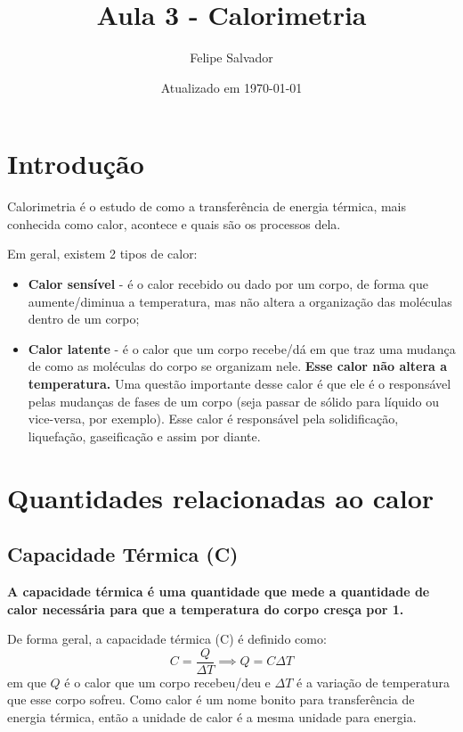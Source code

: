 \documentclass[12pt]{extarticle}
\title{Aula 3 - Calorimetria}
\author{Felipe Salvador}
\date{Atualizado em \today}
\newcommand{\<}{\langle}
\renewcommand{\>}{\rangle}
\theoremstyle{definition}
\begin{document}
\maketitle

\section{Introdução}

Calorimetria é o estudo de como a transferência de energia térmica, mais conhecida como calor, acontece e quais são os processos dela.

Em geral, existem 2 tipos de calor:

\begin{itemize}
    \item \textbf{Calor sensível} - é o calor recebido ou dado por um corpo, de forma que aumente/diminua a temperatura, mas não altera a organização das moléculas dentro de um corpo;
    \item \textbf{Calor latente} - é o calor que um corpo recebe/dá em que traz uma mudança de como as moléculas do corpo se organizam nele. \textbf{Esse calor não altera a temperatura.} Uma questão importante desse calor é que ele é o responsável pelas mudanças de fases de um corpo (seja passar de sólido para líquido ou vice-versa, por exemplo). Esse calor é responsável pela solidificação, liquefação, gaseificação e assim por diante.
\end{itemize}

\section{Quantidades relacionadas ao calor}
\subsection{Capacidade Térmica (C)}

\textbf{A capacidade térmica é uma quantidade que mede a quantidade de calor necessária para que a temperatura do corpo cresça por 1.}

De forma geral, a capacidade térmica (C) é definido como:
\begin{equation}
    C = \frac{Q}{\Delta T} \implies Q = C\Delta T
\end{equation}
\noindent em que $Q$ é o calor que um corpo recebeu/deu e $\Delta T$ é a variação de temperatura que esse corpo sofreu. Como calor é um nome bonito para transferência de energia térmica, então a unidade de calor é a mesma unidade para energia.
\end{document}
